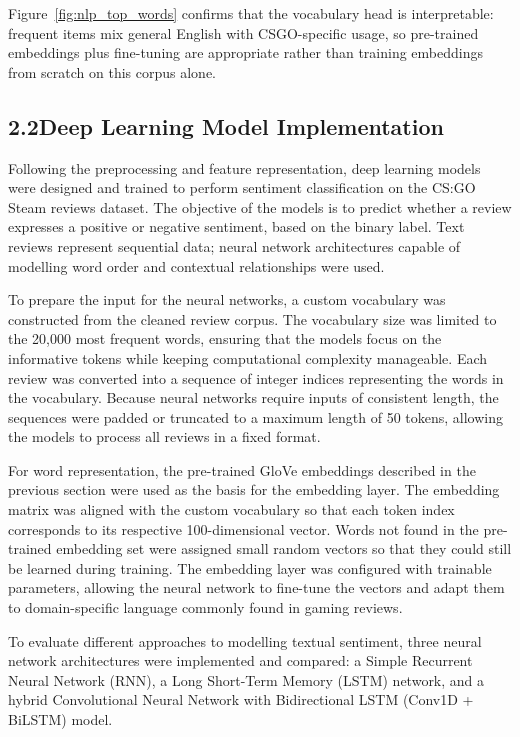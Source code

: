 \documentclass[12pt,a4paper]{article}
\begin{document}
\noindent Figure~\ref{fig:nlp_top_words} confirms that the vocabulary head is interpretable: frequent items mix general English with CSGO-specific usage, so pre-trained embeddings plus fine-tuning are appropriate rather than training embeddings from scratch on this corpus alone.

\subsection{2.2\quad Deep Learning Model Implementation}\label{sec:nlp_model}

Following the preprocessing and feature representation, deep learning models were designed and trained to perform sentiment classification on the CS:GO Steam reviews dataset. The objective of the models is to predict whether a review expresses a positive or negative sentiment, based on the binary label. Text reviews represent sequential data; neural network architectures capable of modelling word order and contextual relationships were used.

To prepare the input for the neural networks, a custom vocabulary was constructed from the cleaned review corpus. The vocabulary size was limited to the 20,000 most frequent words, ensuring that the models focus on the informative tokens while keeping computational complexity manageable. Each review was converted into a sequence of integer indices representing the words in the vocabulary. Because neural networks require inputs of consistent length, the sequences were padded or truncated to a maximum length of 50 tokens, allowing the models to process all reviews in a fixed format.

For word representation, the pre-trained GloVe embeddings described in the previous section were used as the basis for the embedding layer. The embedding matrix was aligned with the custom vocabulary so that each token index corresponds to its respective 100-dimensional vector. Words not found in the pre-trained embedding set were assigned small random vectors so that they could still be learned during training. The embedding layer was configured with trainable parameters, allowing the neural network to fine-tune the vectors and adapt them to domain-specific language commonly found in gaming reviews.

To evaluate different approaches to modelling textual sentiment, three neural network architectures were implemented and compared: a Simple Recurrent Neural Network (RNN), a Long Short-Term Memory (LSTM) network, and a hybrid Convolutional Neural Network with Bidirectional LSTM (Conv1D + BiLSTM) model.
\end{document}
